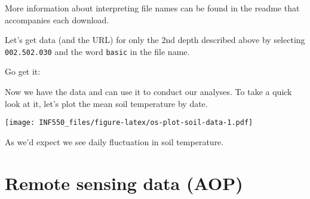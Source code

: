 \documentclass[]{book}
\newenvironment{Shaded}{\begin{snugshade}}{\end{snugshade}}
\newcommand{\CommentTok}[1]{\textcolor[rgb]{0.56,0.35,0.01}{\textit{#1}}}
\newcommand{\DataTypeTok}[1]{\textcolor[rgb]{0.13,0.29,0.53}{#1}}
\newcommand{\KeywordTok}[1]{\textcolor[rgb]{0.13,0.29,0.53}{\textbf{#1}}}
\newcommand{\NormalTok}[1]{#1}
\newcommand{\OperatorTok}[1]{\textcolor[rgb]{0.81,0.36,0.00}{\textbf{#1}}}
\newcommand{\StringTok}[1]{\textcolor[rgb]{0.31,0.60,0.02}{#1}}
\begin{document}
More information about interpreting file names can be found in the readme that
accompanies each download.

Let's get data (and the URL) for only the 2nd depth described above by selecting
\texttt{002.502.030} and the word \texttt{basic} in the file name.

Go get it:

\begin{Shaded}
\end{Shaded}

Now we have the data and can use it to conduct our analyses. To take
a quick look at it, let's plot the mean soil temperature by date.

\begin{Shaded}
\end{Shaded}

\texttt{[image: INF550\_files/figure-latex/os-plot-soil-data-1.pdf]}

As we'd expect we see daily fluctuation in soil temperature.

\hypertarget{remote-sensing-data-aop}{%
\section{Remote sensing data (AOP)}\label{remote-sensing-data-aop}}
\end{document}

